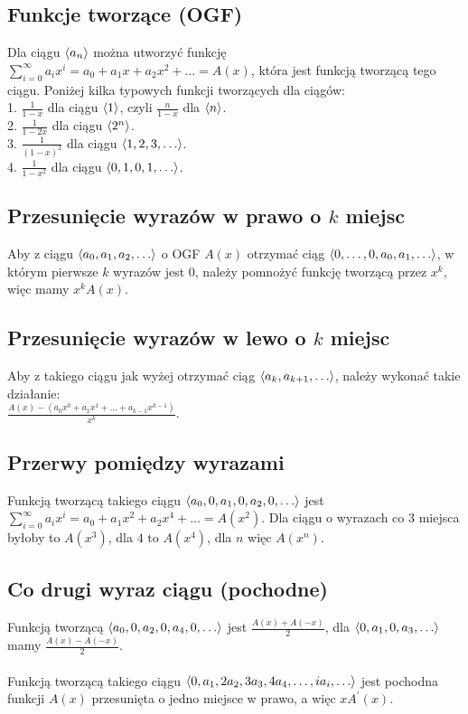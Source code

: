 \subsection*{Funkcje tworzące (OGF)}
Dla ciągu $\left\langle a_n \right\rangle$ można utworzyć funkcję 
$\sum\limits_{i=0}^{\infty} a_i x^i = a_0 + a_1 x + a_2 x^2 + \ldots = A(x)$, która
jest funkcją tworzącą tego ciągu. Poniżej kilka typowych funkcji tworzących dla
ciągów: \\
1. $\frac{1}{1-x}$ dla ciągu $\left\langle 1 \right\rangle$, czyli $\frac{n}{1-x}$ dla $\left\langle n \right\rangle$. \\
2. $\frac{1}{1-2x}$ dla ciągu $\left\langle 2^n \right\rangle$. \\
3. $\frac{1}{(1-x)^2}$ dla ciągu $\left\langle 1, 2, 3, \ldots \right\rangle$. \\
4. $\frac{1}{1-x^2}$ dla ciągu $\left\langle 0, 1, 0, 1, \ldots \right\rangle$. \\

\subsection*{Przesunięcie wyrazów w prawo o $k$ miejsc}
Aby z ciągu $\left\langle a_0, a_1, a_2, \ldots \right\rangle$ o OGF $A(x)$ otrzymać ciąg 
$\left\langle 0, \ldots, 0, a_0, a_1, \ldots \right\rangle$, w którym pierwsze $k$ wyrazów jest $0$,
należy pomnożyć funkcję tworzącą przez $x^k$, więc mamy $x^k A(x)$.

\subsection*{Przesunięcie wyrazów w lewo o $k$ miejsc}
Aby z takiego ciągu jak wyżej otrzymać ciąg $\left\langle a_{k}, a_{k+1}, \ldots \right\rangle$,
należy wykonać takie działanie: \\
$\frac{A(x) - \left( a_0 x^0 + a_1 x^1 + \ldots + a_{k-1} x^{k-1} \right)}{x^k}$.

\subsection*{Przerwy pomiędzy wyrazami}
Funkcją tworzącą takiego ciągu $\left\langle a_0, 0, a_1, 0, a_2, 0, \ldots \right\rangle$ jest
$\sum\limits_{i=0}^{\infty} a_i x^i = a_0 + a_1 x^2 + a_2 x^4 + \ldots = A(x^2)$.
Dla ciągu o wyrazach co $3$ miejsca byłoby to $A(x^3)$, dla $4$ to $A(x^4)$, dla
$n$ więc $A(x^n)$.

\subsection*{Co drugi wyraz ciągu (pochodne)}
Funkcją tworzącą $\left\langle a_0, 0, a_2, 0, a_4, 0, \ldots \right\rangle$ jest 
$\frac{A(x) + A(-x)}{2}$, dla $\left\langle 0, a_1, 0, a_3, \ldots \right\rangle$ mamy
$\frac{A(x) - A(-x)}{2}$. \\ \\
Funkcją tworzącą takiego ciągu 
$\left\langle 0, a_1, 2a_2, 3a_3, 4a_4, \ldots, ia_i, \ldots \right\rangle$
jest pochodna funkcji $A(x)$ przesunięta o jedno miejsce w prawo, a więc $xA^\prime(x)$.

